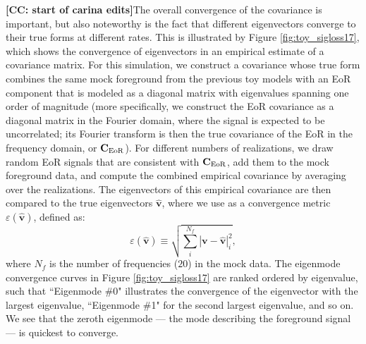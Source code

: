 \documentclass[preprint2,numberedappendix,tighten]{aastex6}  %
\newcommand{\cc}[1]{{\color{purple} \textbf{[CC: #1]}}}
\begin{document}
\cc{start of carina edits}The overall convergence of the covariance is important, but also noteworthy is the fact that different eigenvectors converge to their true forms at different rates. This is illustrated by Figure \ref{fig:toy_sigloss17}, which shows the convergence of eigenvectors in an empirical estimate of a covariance matrix. For this simulation, we construct a covariance whose true form combines the same mock foreground from the previous toy models with an EoR component that is modeled as a diagonal matrix with eigenvalues spanning one order of magnitude (more specifically, we construct the EoR covariance as a diagonal matrix in the Fourier domain, where the signal is expected to be uncorrelated; its Fourier transform is then the true covariance of the EoR in the frequency domain, or $\textbf{C}_{\rm EoR}$). For different numbers of realizations, we draw random EoR signals that are consistent with $\textbf{C}_{\rm EoR}$, add them to the mock foreground data, and compute the combined empirical covariance by averaging over the realizations. The eigenvectors of this empirical covariance are then compared to the true eigenvectors $\widehat{\textbf{v}}$, where we use as a convergence metric $\varepsilon(\widehat{\textbf{v}})$, defined as:
\begin{equation}
\label{eq:converge_eig}
\varepsilon (\widehat{\textbf{v}}) \equiv \sqrt{\sum_{i}^{N_{f}}|\textbf{v}-\widehat{\textbf{v}}|_{i}^2},
\end{equation}
where $N_{f}$ is the number of frequencies ($20$) in the mock data. The eigenmode convergence curves in Figure \ref{fig:toy_sigloss17} are ranked ordered by eigenvalue, such that ``Eigenmode \#0" illustrates the convergence of the eigenvector with the largest eigenvalue, ``Eigenmode \#1" for the second largest eigenvalue, and so on. We see that the zeroth eigenmode --- the mode describing the foreground signal --- is quickest to converge.
\end{document}
